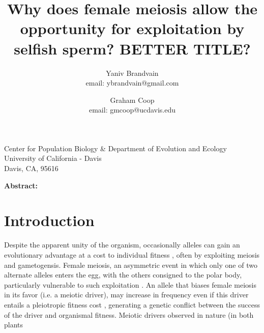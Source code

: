 \documentclass[12pt,letterpaper]{article}
\title{Why does female meiosis allow the opportunity for exploitation
  by selfish sperm? BETTER TITLE?}
\author{Yaniv Brandvain \\ email: ybrandvain@gmail.com  \and Graham Coop \\ email: gmcoop@ucdavis.edu }
\date{}
\newcommand{\yb}[1]{{ \color{blue} #1}}
\begin{document}
\maketitle
\begin{center}
Center for Population Biology \& Department of Evolution and Ecology \\ University of California - Davis \\ Davis, CA, 95616
\end{center}

{\bf Abstract:}
\newpage

\section*{Introduction}

Despite the apparent unity of the organism, occasionally alleles can
gain an evolutionary advantage at a cost to  individual fitness
\citep{Burt2006}, often by exploiting meiosis and gametogensis.
Female meiosis, an asymmetric event in which only one of two alternate alleles
enters the  egg, with the others consigned to the polar body, \yb{particularly vulnerable to such exploitation}  \citep{Sandler1957,Pardo-ManuelDeVillena2001a}. 
An allele that biases female meiosis in its favor (i.e. a meiotic driver), may increase in frequency even if this driver entails a pleiotropic fitness cost \citep{Prout1973}, generating a genetic conflict between the success of the driver and organismal fitness.
Meiotic drivers observed in nature (in both plants
\end{document}
